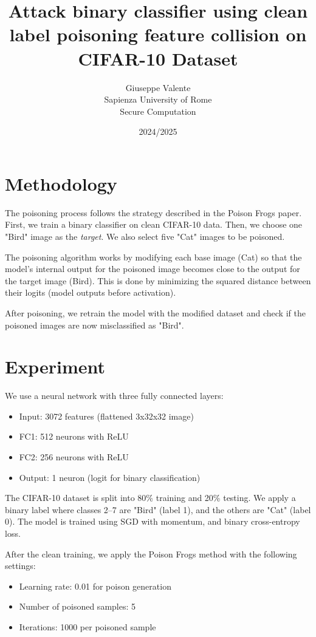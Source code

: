 \documentclass{article}
\author{Giuseppe Valente \\ Sapienza University of Rome \\ Secure Computation\\}
\date{2024/2025}
\title{Attack binary classifier using clean label poisoning feature collision on CIFAR-10 Dataset\\}
\begin{document}
\maketitle

\newpage

\tableofcontents

\newpage






\section{Methodology}
The poisoning process follows the strategy described in the Poison Frogs paper. First, we train a binary classifier on clean CIFAR-10 data. Then, we choose one "Bird" image as the \textit{target}. We also select five "Cat" images to be poisoned.

The poisoning algorithm works by modifying each base image (Cat) so that the model’s internal output for the poisoned image becomes close to the output for the target image (Bird). This is done by minimizing the squared distance between their logits (model outputs before activation).

After poisoning, we retrain the model with the modified dataset and check if the poisoned images are now misclassified as "Bird".

\section{Experiment}
We use a neural network with three fully connected layers:
\begin{itemize}
    \item Input: 3072 features (flattened 3x32x32 image)
    \item FC1: 512 neurons with ReLU
    \item FC2: 256 neurons with ReLU
    \item Output: 1 neuron (logit for binary classification)
\end{itemize}

The CIFAR-10 dataset is split into 80\% training and 20\% testing. We apply a binary label where classes 2--7 are "Bird" (label 1), and the others are "Cat" (label 0). The model is trained using SGD with momentum, and binary cross-entropy loss.

After the clean training, we apply the Poison Frogs method with the following settings:
\begin{itemize}
    \item Learning rate: 0.01 for poison generation
    \item Number of poisoned samples: 5
    \item Iterations: 1000 per poisoned sample
\end{itemize}
\end{document}
